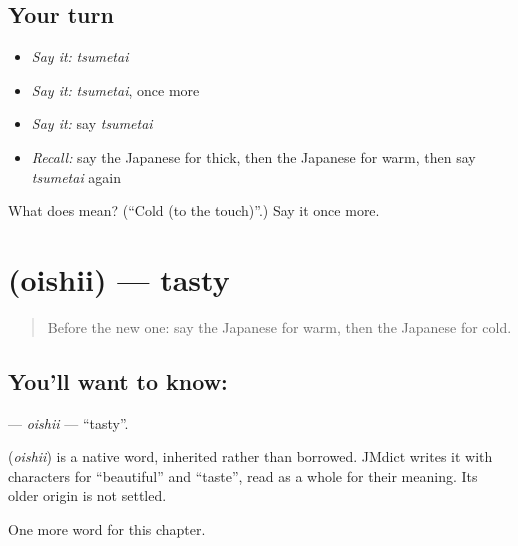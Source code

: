 \subsection*{Your turn}
\begin{itemize}
\raggedright
  \item \emph{Say it:} \emph{tsumetai}
  \item \emph{Say it:} \emph{tsumetai}, once more
  \item \emph{Say it:} say \emph{tsumetai}
  \item \emph{Recall:} say the Japanese for thick, then the Japanese for warm, then say \emph{tsumetai} again
\end{itemize}

\begin{tcolorbox}[breakable,colback=teal!4,colframe=teal!35!black,title={Before you move on}]
What does  mean? (\textquotedblleft{}Cold (to the touch)\textquotedblright{}.) Say it once more.
\end{tcolorbox}
\section[\texorpdfstring{\ja{おいしい} (oishii)}{おいしい (oishii)}]{ (oishii) — tasty}

\label{lesson:JA-C53-oishii}



\begin{quote}
Before the new one: say the Japanese for warm, then the Japanese for cold.
\end{quote}

\subsection*{You'll want to know: }
\textbf{} — \emph{oishii} — \textquotedblleft{}tasty\textquotedblright{}.

\begin{cousinweb}
\textbf{} (\emph{oishii}) is a native word, inherited rather than borrowed. JMdict writes it with characters for \textquotedblleft{}beautiful\textquotedblright{} and \textquotedblleft{}taste\textquotedblright{}, read as a whole for their meaning. Its older origin is not settled.
\end{cousinweb}

\begin{grammarlens}[title={What you've built}]
One more word for this chapter.
\end{grammarlens}

